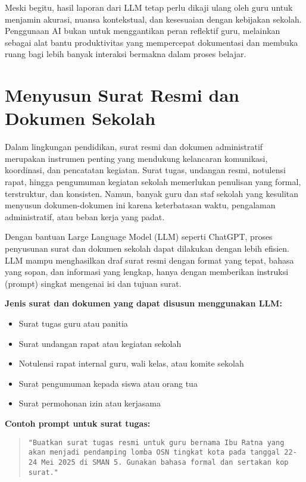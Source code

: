 Meski begitu, hasil laporan dari LLM tetap perlu dikaji ulang oleh guru untuk menjamin akurasi, nuansa kontekstual, dan kesesuaian dengan kebijakan sekolah. Penggunaan AI bukan untuk menggantikan peran reflektif guru, melainkan sebagai alat bantu produktivitas yang mempercepat dokumentasi dan membuka ruang bagi lebih banyak interaksi bermakna dalam proses belajar.

\section{Menyusun Surat Resmi dan Dokumen Sekolah}

Dalam lingkungan pendidikan, surat resmi dan dokumen administratif merupakan instrumen penting yang mendukung kelancaran komunikasi, koordinasi, dan pencatatan kegiatan. Surat tugas, undangan resmi, notulensi rapat, hingga pengumuman kegiatan sekolah memerlukan penulisan yang formal, terstruktur, dan konsisten. Namun, banyak guru dan staf sekolah yang kesulitan menyusun dokumen-dokumen ini karena keterbatasan waktu, pengalaman administratif, atau beban kerja yang padat.

Dengan bantuan Large Language Model (LLM) seperti ChatGPT, proses penyusunan surat dan dokumen sekolah dapat dilakukan dengan lebih efisien. LLM mampu menghasilkan draf surat resmi dengan format yang tepat, bahasa yang sopan, dan informasi yang lengkap, hanya dengan memberikan instruksi (prompt) singkat mengenai isi dan tujuan surat.

\textbf{Jenis surat dan dokumen yang dapat disusun menggunakan LLM:}
\begin{itemize}
	\item Surat tugas guru atau panitia
	\item Surat undangan rapat atau kegiatan sekolah
	\item Notulensi rapat internal guru, wali kelas, atau komite sekolah
	\item Surat pengumuman kepada siswa atau orang tua
	\item Surat permohonan izin atau kerjasama
\end{itemize}

\textbf{Contoh prompt untuk surat tugas:}

\begin{quote}
	\centering
	\texttt{"Buatkan surat tugas resmi untuk guru bernama Ibu Ratna yang akan menjadi pendamping lomba OSN tingkat kota pada tanggal 22-24 Mei 2025 di SMAN 5. Gunakan bahasa formal dan sertakan kop surat."}
\end{quote}

